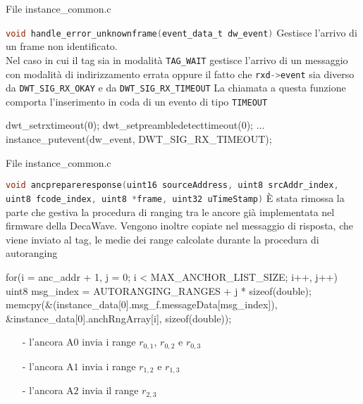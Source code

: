 \begin{frame}[fragile]{File instance\_common.c}
  \begin{block}{\lstinline[language=C]!void handle_error_unknownframe(event_data_t dw_event)! \oldfunction}
    Gestisce l'arrivo di un frame non identificato.\\
    Nel caso in cui il tag sia in modalità \lstinline[language=C]!TAG_WAIT! gestisce l'arrivo di un messaggio con modalità di indirizzamento
    errata oppure il fatto che \lstinline[language=C]!rxd->event! sia diverso da \lstinline[language=C]!DWT_SIG_RX_OKAY! e da \lstinline[language=C]!DWT_SIG_RX_TIMEOUT!
    La chiamata a questa funzione comporta l'inserimento in coda di un evento di tipo \lstinline[language=C]!TIMEOUT!
    \begin{C}
      dwt_setrxtimeout(0);
      dwt_setpreambledetecttimeout(0);
      ...
      instance_putevent(dw_event, DWT_SIG_RX_TIMEOUT);
    \end{C}
  \end{block}
\end{frame}

\begin{frame}[fragile,shrink=20]{File instance\_common.c}
  \begin{block}{\lstinline[language=C]!void ancprepareresponse(uint16 sourceAddress, uint8 srcAddr_index, uint8 fcode_index, uint8 *frame, uint32 uTimeStamp)! \oldfunction}
    È stata rimossa la parte che gestiva la procedura di ranging tra le ancore già implementata nel firmware della DecaWave. Vengono inoltre copiate nel messaggio
    di risposta, che viene inviato al tag, le medie dei range calcolate durante la procedura di autoranging
    \begin{C}
      for(i = anc_addr + 1, j = 0; i < MAX_ANCHOR_LIST_SIZE; i++, j++)
      {
        uint8 msg_index = AUTORANGING_RANGES + j * sizeof(double);
        memcpy(&(instance_data[0].msg_f.messageData[msg_index]), &instance_data[0].anchRngArray[i], sizeof(double));
      }
    \end{C}
    \begin{itemize}
    \item[-] l'ancora A$0$ invia i range $r_{0,1}$, $r_{0,2}$ e $r_{0,3}$
    \item[-] l'ancora A$1$ invia i range $r_{1,2}$ e $r_{1,3}$
    \item[-] l'ancora A$2$ invia il range $r_{2,3}$
    \end{itemize}
  \end{block}
\end{frame}

